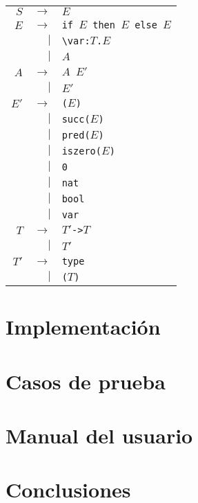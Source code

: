 \documentclass[11pt]{article}
\begin{document}
\begin{tabular}{rrl}
$S$  & $\rightarrow$ \qquad & $E$ \\
$E$  & $\rightarrow$ \qquad & \verb|if |$E$\verb| then |$E$\verb| else |$E$ \\
     & $\vert$              & \verb|\var:|$T$\verb|.|$E$ \\
     & $\vert$              & $A$ \\
$A$  & $\rightarrow$ \qquad & $A$\verb| |$E'$ \\
     & $\vert$              & $E'$ \\
$E'$ & $\rightarrow$ \qquad & \verb|(|$E$\verb|)| \\
     & $\vert$              & \verb|succ(|$E$\verb|)| \\
     & $\vert$              & \verb|pred(|$E$\verb|)| \\
     & $\vert$              & \verb|iszero(|$E$\verb|)| \\
     & $\vert$              & \verb|0| \\
     & $\vert$              & \verb|nat| \\
     & $\vert$              & \verb|bool| \\
     & $\vert$              & \verb|var| \\
$T$  & $\rightarrow$ \qquad & $T'$\verb|->|$T$ \\
     & $\vert$              & $T'$ \\
$T'$ & $\rightarrow$ \qquad & \verb|type| \\
     & $\vert$              & \verb|(|$T$\verb|)| \\
\end{tabular}


\section{Implementación}




\section{Casos de prueba}


\section{Manual del usuario}


\section{Conclusiones}

\end{document}
